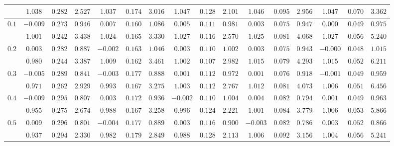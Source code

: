 \begin{table}[ht]
\begin{center}
\begin{tabular}{|c|ccc|ccc|ccc|ccc|ccc|}
 & $ 1.038 $ & $ 0.282 $ & $ 2.527 $ & $ 1.037 $ & $ 0.174 $ & $ 3.016 $ & $ 1.047 $ & $ 0.128 $ & $ 2.101 $ & $ 1.046 $ & $ 0.095 $ & $ 2.956 $ & $ 1.047 $ & $ 0.070 $ & $ 3.362 $\\ 
\hline 
$0.1$ & $ -0.009 $ & $ 0.273 $ & $ 0.946 $ & $ 0.007 $ & $ 0.160 $ & $ 1.086 $ & $ 0.005 $ & $ 0.111 $ & $ 0.981 $ & $ 0.003 $ & $ 0.075 $ & $ 0.947 $ & $ 0.000 $ & $ 0.049 $ & $ 0.975 $\\ 
 & $ 1.001 $ & $ 0.242 $ & $ 3.438 $ & $ 1.024 $ & $ 0.165 $ & $ 3.330 $ & $ 1.027 $ & $ 0.116 $ & $ 2.570 $ & $ 1.025 $ & $ 0.081 $ & $ 4.068 $ & $ 1.027 $ & $ 0.056 $ & $ 5.240 $\\ 
\hline 
$0.2$ & $ 0.003 $ & $ 0.282 $ & $ 0.887 $ & $ -0.002 $ & $ 0.163 $ & $ 1.046 $ & $ 0.003 $ & $ 0.110 $ & $ 1.002 $ & $ 0.003 $ & $ 0.075 $ & $ 0.943 $ & $ -0.000 $ & $ 0.048 $ & $ 1.015 $\\ 
 & $ 0.980 $ & $ 0.244 $ & $ 3.387 $ & $ 1.009 $ & $ 0.162 $ & $ 3.461 $ & $ 1.002 $ & $ 0.107 $ & $ 2.982 $ & $ 1.015 $ & $ 0.079 $ & $ 4.293 $ & $ 1.015 $ & $ 0.052 $ & $ 6.211 $\\ 
\hline 
$0.3$ & $ -0.005 $ & $ 0.289 $ & $ 0.841 $ & $ -0.003 $ & $ 0.177 $ & $ 0.888 $ & $ 0.001 $ & $ 0.112 $ & $ 0.972 $ & $ 0.001 $ & $ 0.076 $ & $ 0.918 $ & $ -0.001 $ & $ 0.049 $ & $ 0.959 $\\ 
 & $ 0.971 $ & $ 0.262 $ & $ 2.929 $ & $ 0.993 $ & $ 0.167 $ & $ 3.275 $ & $ 1.003 $ & $ 0.112 $ & $ 2.767 $ & $ 1.012 $ & $ 0.081 $ & $ 4.073 $ & $ 1.006 $ & $ 0.051 $ & $ 6.456 $\\ 
\hline 
$0.4$ & $ -0.009 $ & $ 0.295 $ & $ 0.807 $ & $ 0.003 $ & $ 0.172 $ & $ 0.936 $ & $ -0.002 $ & $ 0.110 $ & $ 1.004 $ & $ 0.004 $ & $ 0.082 $ & $ 0.794 $ & $ 0.001 $ & $ 0.049 $ & $ 0.963 $\\ 
 & $ 0.955 $ & $ 0.275 $ & $ 2.674 $ & $ 0.988 $ & $ 0.167 $ & $ 3.258 $ & $ 0.996 $ & $ 0.124 $ & $ 2.221 $ & $ 1.001 $ & $ 0.084 $ & $ 3.779 $ & $ 1.006 $ & $ 0.053 $ & $ 5.866 $\\ 
\hline 
$0.5$ & $ 0.009 $ & $ 0.296 $ & $ 0.801 $ & $ -0.004 $ & $ 0.177 $ & $ 0.889 $ & $ 0.003 $ & $ 0.116 $ & $ 0.900 $ & $ -0.003 $ & $ 0.082 $ & $ 0.786 $ & $ 0.003 $ & $ 0.052 $ & $ 0.866 $\\ 
 & $ 0.937 $ & $ 0.294 $ & $ 2.330 $ & $ 0.982 $ & $ 0.179 $ & $ 2.849 $ & $ 0.988 $ & $ 0.128 $ & $ 2.113 $ & $ 1.006 $ & $ 0.092 $ & $ 3.156 $ & $ 1.004 $ & $ 0.056 $ & $ 5.241 $\\ 
\hline 

\end{tabular}
\end{center}
\end{table}
